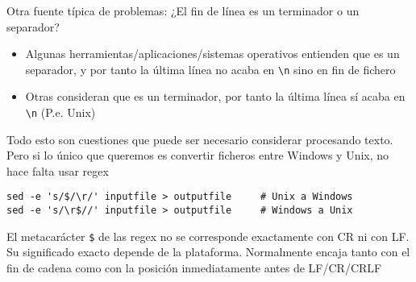 \documentclass[ucs]{beamer}
\begin{document}
\begin{frame}[fragile]
\frametitle{}
Otra fuente típica de problemas:
¿El fin de línea es un terminador o un separador?
\begin{itemize}
\item
Algunas herramientas/aplicaciones/sistemas operativos entienden
que es un separador, y por tanto la última línea no acaba
en \verb|\n| sino en fin de fichero
\item
Otras consideran que es un terminador, por tanto la última
línea sí acaba en \verb|\n| (P.e. Unix)
\end{itemize}

Todo esto son cuestiones que puede ser necesario considerar
procesando texto. Pero si lo único que queremos es
convertir ficheros entre Windows y Unix, no hace falta
usar regex
  \begin{footnotesize}
  \begin{verbatim}
sed -e 's/$/\r/' inputfile > outputfile     # Unix a Windows
sed -e 's/\r$//' inputfile > outputfile     # Windows a Unix
  \end{verbatim}
  \end{footnotesize}

El metacarácter \verb|$| de las regex no se corresponde exactamente
con CR ni con LF. Su significado exacto depende de la plataforma.
Normalmente encaja tanto con el fin de cadena como con
la posición inmediatamente antes de LF/CR/CRLF



\end{frame}
\end{document}
